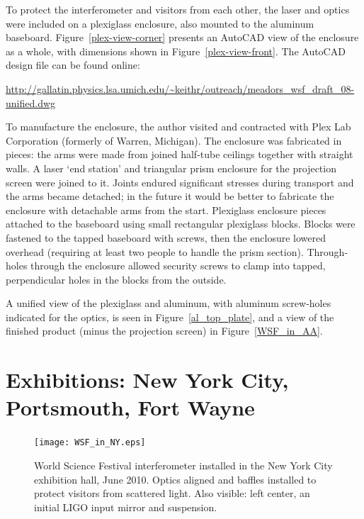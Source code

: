 To protect the interferometer and visitors from each other, the laser and optics were included on a plexiglass enclosure, also mounted to the aluminum baseboard.
Figure~\ref{plex-view-corner} presents an AutoCAD view of the enclosure as a whole, with dimensions shown in Figure~\ref{plex-view-front}. 
The AutoCAD design file can be found online:

\url{http://gallatin.physics.lsa.umich.edu/~keithr/outreach/meadors_wsf_draft_08-unified.dwg}

To manufacture the enclosure, the author visited and contracted with Plex Lab Corporation (formerly of Warren, Michigan).
The enclosure was fabricated in pieces: the arms were made from joined half-tube ceilings together with straight walls.
A laser `end station' and triangular prism enclosure for the projection screen were joined to it.
Joints endured significant stresses during transport and the arms became detached; in the future it would be better to fabricate the enclosure with detachable arms from the start.
Plexiglass enclosure pieces attached to the baseboard using small rectangular plexiglass blocks.
Blocks were fastened to the tapped baseboard with screws, then the enclosure lowered overhead (requiring at least two people to handle the prism section).
Through-holes through the enclosure allowed security screws to clamp into tapped, perpendicular holes in the blocks from the outside.

A unified view of the plexiglass and aluminum, with aluminum screw-holes indicated for the optics, is seen in Figure~\ref{al_top_plate}, and a view of the finished product (minus the projection screen) in Figure~\ref{WSF_in_AA}.




    \section{Exhibitions: New York City, Portsmouth, Fort Wayne}
    \label{exhibitions}

	\begin{figure}
	\begin{center}
	\texttt{[image: WSF\_in\_NY.eps]}
	\caption{World Science Festival interferometer installed in the New York City exhibition hall, June 2010. Optics aligned and baffles installed to protect visitors from scattered light. Also visible: left center, an initial LIGO input mirror and suspension.}
	\label{WSF_IFO_photo}
	\end{center}
	\end{figure}

